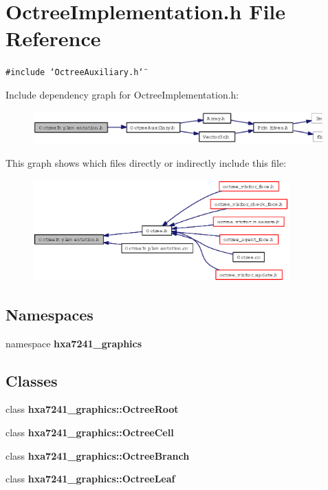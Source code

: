 \section{Octree\-Implementation.h File Reference}
\label{OctreeImplementation_8h}
{\tt \#include \char`\"{}Octree\-Auxiliary.h\char`\"{}}\par


Include dependency graph for Octree\-Implementation.h:\begin{figure}[H]
\begin{center}
\leavevmode
\includegraphics[width=316pt]{OctreeImplementation_8h__incl}
\end{center}
\end{figure}


This graph shows which files directly or indirectly include this file:\begin{figure}[H]
\begin{center}
\leavevmode
\includegraphics[width=279pt]{OctreeImplementation_8h__dep__incl}
\end{center}
\end{figure}
\subsection*{Namespaces}
\begin{CompactItemize}
\item 
namespace {\bf hxa7241\_\-graphics}
\end{CompactItemize}
\subsection*{Classes}
\begin{CompactItemize}
\item 
class {\bf hxa7241\_\-graphics::Octree\-Root}
\item 
class {\bf hxa7241\_\-graphics::Octree\-Cell}
\item 
class {\bf hxa7241\_\-graphics::Octree\-Branch}
\item 
class {\bf hxa7241\_\-graphics::Octree\-Leaf}
\end{CompactItemize}
